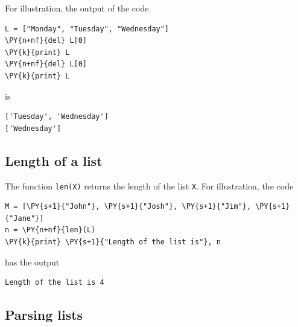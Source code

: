 \noindent
For illustration, the output of the code \\

\begin{bbox}
\begin{Verbatim}[commandchars=\\\{\}]
L = ["Monday", "Tuesday", "Wednesday"]
\PY{n+nf}{del} L[0]
\PY{k}{print} L
\PY{n+nf}{del} L[0]
\PY{k}{print} L
\end{Verbatim}
\end{bbox}
\vspace{6mm}

\noindent
is \\

\begin{ybox}
\begin{Verbatim}[commandchars=\\\{\}]
['Tuesday', 'Wednesday']
['Wednesday']
\end{Verbatim}
\end{ybox}
\vspace{6mm}

\subsection[\ \ Length of a list]{Length of a list}

\noindent
The function {\tt len(X)} returns the length of the list {\tt X}.
For illustration, the code \\

\begin{bbox}
\begin{Verbatim}[commandchars=\\\{\}]
M = [\PY{s+1}{"John"}, \PY{s+1}{"Josh"}, \PY{s+1}{"Jim"}, \PY{s+1}{"Jane"}]
n = \PY{n+nf}{len}(L)
\PY{k}{print} \PY{s+1}{"Length of the list is"}, n
\end{Verbatim}
\end{bbox}
\vspace{6mm}

\noindent
has the output\\

\begin{ybox}
\begin{Verbatim}[commandchars=\\\{\}]
Length of the list is 4
\end{Verbatim}
\end{ybox}
\vspace{6mm}

\subsection[\ \ Parsing lists]{Parsing lists}

